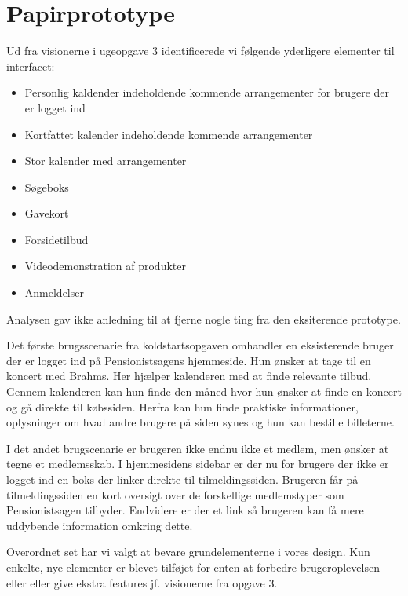\section{Papirprototype}

Ud fra visionerne i ugeopgave 3 identificerede vi følgende yderligere
elementer til interfacet:

\begin{itemize}
    \item Personlig kaldender indeholdende kommende arrangementer for brugere der er logget ind
    \item Kortfattet kalender indeholdende kommende arrangementer
    \item Stor kalender med arrangementer
    \item Søgeboks
    \item Gavekort
    \item Forsidetilbud
    \item Videodemonstration af produkter
    \item Anmeldelser
\end{itemize}

Analysen gav ikke anledning til at fjerne nogle ting fra den eksiterende
prototype.

Det første brugsscenarie fra koldstartsopgaven omhandler en eksisterende
bruger der er logget ind på Pensionistsagens hjemmeside. Hun ønsker at tage
til en koncert med Brahms. Her hjælper kalenderen med at finde relevante
tilbud. Gennem kalenderen kan hun finde den måned hvor hun ønsker at finde
en koncert og gå direkte til købssiden. Herfra kan hun finde praktiske
informationer, oplysninger om hvad andre brugere på siden synes og hun kan
bestille billeterne.

I det andet brugscenarie er brugeren ikke endnu ikke et medlem, men ønsker at
tegne et medlemsskab. I hjemmesidens sidebar er der nu for brugere der ikke
er logget ind en boks der linker direkte til tilmeldingssiden. Brugeren får
på tilmeldingssiden en kort oversigt over de forskellige medlemstyper som
Pensionistsagen tilbyder. Endvidere er der et link så brugeren kan få mere
uddybende information omkring dette.

Overordnet set har vi valgt at bevare grundelementerne i vores design.
Kun enkelte, nye elementer er blevet tilføjet for enten at forbedre
brugeroplevelsen eller eller give ekstra features jf. visionerne fra opgave 3.
